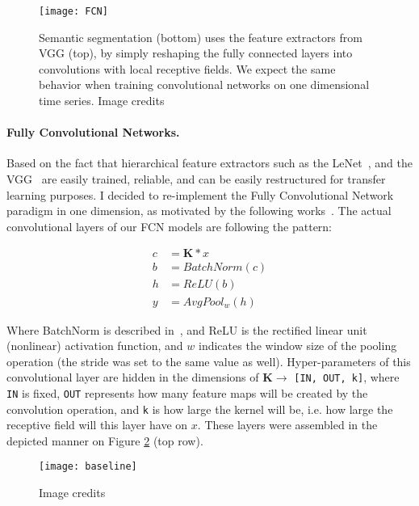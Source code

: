 \begin{figure}
  \centering
  \texttt{[image: FCN]}
  \caption{Semantic segmentation (bottom) uses the feature extractors from VGG (top), by simply reshaping the fully connected layers into convolutions with local receptive fields. We expect the same behavior when training convolutional networks on one dimensional time series. Image credits~\cite{Long_2015_CVPR}}
  \label{fig:FCN}
\end{figure}

\paragraph{Fully Convolutional Networks.}
Based on the fact that hierarchical feature extractors such as the LeNet~\cite{lecun1995convolutional}, and the VGG~\cite{simonyan_very_2014} are easily trained, reliable, and can be easily restructured for transfer learning purposes. I decided to re-implement the Fully Convolutional Network~\cite{Long_2015_CVPR} paradigm in one dimension, as motivated by the following works~\cite{mittelman2015time, langkvist2014review}.
The actual convolutional layers of our FCN models are following the pattern:
\begin{center}\label{eq:conv}
  \begin{equation*}
    \begin{split}
      c &= \mathbf{K} \ast x\\
      b &= BatchNorm(c)\\
      h &= ReLU(b)\\
      y &= AvgPool_w(h)
    \end{split}
  \end{equation*}
\end{center}

Where BatchNorm is described in~\cite{ioffe_batch_2015}, and ReLU is the rectified linear unit (nonlinear) activation function, and $w$ indicates the window size of the pooling operation (the stride was set to the same value as well).
Hyper-parameters of this convolutional layer are hidden in the dimensions of  $\mathbf{K}\rightarrow$ \texttt{[IN, OUT, k]}, where \texttt{IN} is fixed, \texttt{OUT} represents how many feature maps will be created by the convolution operation, and \texttt{k} is how large the kernel will be, i.e. how large the receptive field will this layer have on $x$.
These layers were assembled in the depicted manner on Figure \ref{fig:baseline} (top row).

\begin{figure}
  \centering
  \texttt{[image: baseline]}
  \caption{Image credits~\cite{wang2016time}}
  \label{fig:baseline}
\end{figure}


